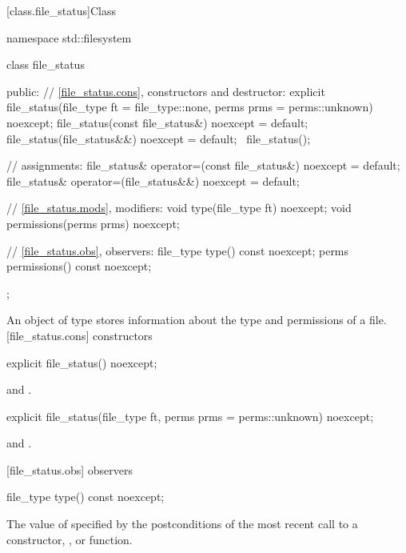 [class.file_status]{Class }

\begin{codeblock}
namespace std::filesystem {
  class file_status {
  public:
    // \ref{file_status.cons}, constructors and destructor:
    explicit file_status(file_type ft = file_type::none,
                         perms prms = perms::unknown) noexcept;
    file_status(const file_status&) noexcept = default;
    file_status(file_status&&) noexcept = default;
   ~file_status();

    // assignments:
    file_status& operator=(const file_status&) noexcept = default;
    file_status& operator=(file_status&&) noexcept = default;

    // \ref{file_status.mods}, modifiers:
    void       type(file_type ft) noexcept;
    void       permissions(perms prms) noexcept;

    // \ref{file_status.obs}, observers:
    file_type  type() const noexcept;
    perms      permissions() const noexcept;
  };
}
\end{codeblock}

\pnum
An object of type  stores information about the type
and permissions of a file.
[file_status.cons]{ constructors}

\begin{itemdecl}
explicit file_status() noexcept;
\end{itemdecl}

\begin{itemdescr}
\pnum
\postconditions {} and .
\end{itemdescr}

\begin{itemdecl}
explicit file_status(file_type ft, perms prms = perms::unknown) noexcept;
\end{itemdecl}

\begin{itemdescr}
\pnum
\postconditions {} and .
\end{itemdescr}

[file_status.obs]{ observers}

\begin{itemdecl}
file_type type() const noexcept;
\end{itemdecl}

\begin{itemdescr}
\pnum
\returns The value of  specified by the postconditions of the most recent call to a constructor,
  , or  function.
\end{itemdescr}

